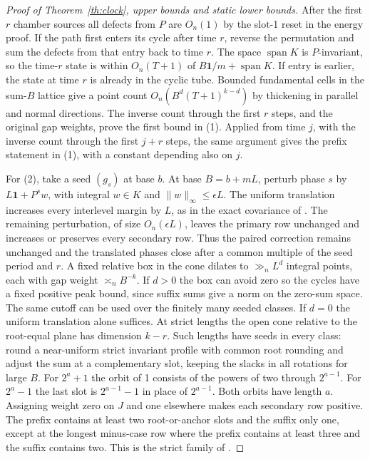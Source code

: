 \documentclass[11pt]{amsart}
\theoremstyle{definition}
\newcommand{\one}{\mathbf 1}
\begin{document}
\begin{proof}[Proof of Theorem~\ref{th:clock}, upper bounds and static lower bounds]
After the first \(r\) chamber sources all defects from \(P\)
are \(O_n(1)\) by the slot-1 reset in the energy proof. If the
path first enters its cycle after time \(r\), reverse the
permutation and sum the defects from that entry back to time \(r\).
The space \(\operatorname{span}K\) is \(P\)-invariant, so the
time-\(r\) state is within \(O_n(T+1)\) of
\(B\one/m+\operatorname{span}K\). If entry is earlier, the
state at time \(r\) is already in the cyclic tube. Bounded
fundamental cells in the sum-\(B\) lattice give a point count
\(O_n(B^d(T+1)^{k-d})\) by thickening in parallel and normal
directions. The inverse count through the first \(r\) steps, and
the original gap weights, prove the first bound in (1). Applied from
time \(j\), with the inverse count through the first \(j+r\) steps, the
same argument gives the prefix statement in (1), with a constant
depending also on \(j\).

For (2), take a seed \((g_s)\) at base \(b\). At base
\(B=b+mL\), perturb phase \(s\) by \(L\one+P^s w\), with
integral \(w\in K\) and \(\|w\|_\infty\le\epsilon L\).
The uniform translation increases every interlevel margin by \(L\),
as in the exact covariance of \cite[Section~6]{G4}.
The remaining perturbation, of size \(O_n(\epsilon L)\), leaves the
primary row unchanged and increases or preserves every secondary
row. Thus the paired correction remains unchanged and the translated
phases close after a common multiple of the seed period and \(r\).
A fixed relative box in the cone dilates to \(\gg_n L^d\)
integral points, each with gap weight \(\asymp_n B^{-k}\).
If \(d>0\) the box can avoid zero so the cycles have a fixed
positive peak bound, since suffix sums give a norm on the zero-sum
space. The same cutoff can be used over the finitely many seeded
classes. If \(d=0\) the uniform translation alone suffices.
At strict lengths the open cone relative to the root-equal plane
has dimension \(k-r\). Such lengths have seeds in every class:
round a near-uniform strict invariant profile with common root
rounding and adjust the sum at a complementary slot, keeping the
slacks in all rotations for large \(B\). For \(2^a+1\) the orbit of 1 consists of the powers of two
through \(2^{a-1}\). For \(2^a-1\) the last slot is
\(2^{a-1}-1\) in place of \(2^{a-1}\). Both orbits have
length \(a\). Assigning weight zero on \(J\) and one elsewhere
makes each secondary row positive. The prefix contains at
least two root-or-anchor slots and the suffix only one, except
at the longest minus-case row where the prefix contains at
least three and the suffix contains two. This is the strict family of \cite[Section~3]{G10}.


\end{proof}
\end{document}
